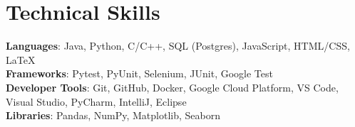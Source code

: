 \documentclass[letterpaper,11pt]{article}
\begin{document}
    \section{Technical Skills}
    \label{sec:technicalskills}
    \begin{itemize}[leftmargin=0.15in, label={}]
        \small{\item{
            \textbf{Languages}{: Java, Python, C/C++, SQL (Postgres), JavaScript, HTML/CSS, LaTeX} \\
            \textbf{Frameworks}{: Pytest, PyUnit, Selenium, JUnit, Google Test} \\
            \textbf{Developer Tools}{: Git, GitHub, Docker, Google Cloud Platform, VS Code, Visual Studio, PyCharm, IntelliJ, Eclipse} \\
            \textbf{Libraries}{: Pandas, NumPy, Matplotlib, Seaborn}
        }}
    \end{itemize}

\end{document}
